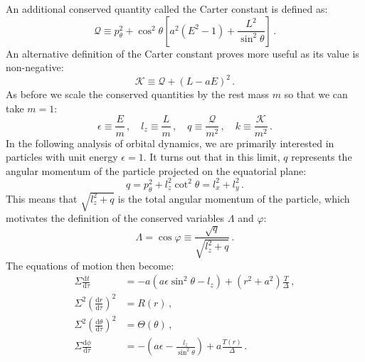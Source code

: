 \documentclass[
    reprint,
    prd,
    nofootinbib,
    amsmath,amssymb,
    aps,
    floatfix,
]{revtex4-2}
\begin{document}
An additional conserved quantity called the Carter constant is defined as:
\begin{equation}
    \mathcal{Q} \equiv p_{\theta}^{2} + \cos^{2}{\theta} \left[ a^{2} (E^{2} - 1) + \frac{L^{2}}{\sin^{2}{\theta}} \right] \, .
\end{equation}
An alternative definition of the Carter constant proves more useful as its value is non-negative:
\begin{equation}
    \mathcal{K} \equiv \mathcal{Q} + (L - aE)^{2} \, .
\end{equation}
As before we scale the conserved quantities by the rest mass $m$ so that we can take $m = 1$:
\begin{equation}
    \epsilon \equiv \frac{E}{m} \, , \quad l_{z} \equiv \frac{L}{m} \, , \quad q \equiv \frac{\mathcal{Q}}{m^{2}} \, , \quad k \equiv \frac{\mathcal{K}}{m^{2}} \, .
\end{equation}
In the following analysis of orbital dynamics, we are primarily interested in particles with unit energy $\epsilon = 1$. It turns out that in this limit, $q$ represents the angular momentum of the particle projected on the equatorial plane:
\begin{equation}
    q = p_{\theta}^{2} + l_{z}^{2} \cot^{2}{\theta} = l_{x}^{2} + l_{y}^{2} \, .
\end{equation}
This means that $\sqrt{l_{z}^{2} + q}$ is the total angular momentum of the particle, which motivates the definition of the conserved variables $\Lambda$ and $\varphi$:
\begin{equation}
    \Lambda = \cos{\varphi} \equiv \frac{\sqrt{q}}{\sqrt{l_{z}^{2} + q}} \, .
    \label{eq:lambda}
\end{equation}
The equations of motion then become:
\begin{equation}
    \begin{split}
        \Sigma \frac{\mathrm{d}t}{\mathrm{d}\tau} &= -a(a \epsilon \sin^{2}{\theta} - l_{z}) + (r^{2} + a^{2}) \frac{T}{\Delta} \, , \\
        \Sigma^{2} \left( \frac{\mathrm{d}r}{\mathrm{d}\tau} \right)^{2} &= R(r) \, , \\
        \Sigma^{2} \left( \frac{\mathrm{d}\theta}{\mathrm{d}\tau} \right)^{2} &= \Theta(\theta) \, , \\
        \Sigma \frac{\mathrm{d}\phi}{\mathrm{d}\tau} &= -\left( a \epsilon - \frac{l_{z}}{\sin^{2}{\theta}} \right) + a \frac{T(r)}{\Delta} \, .
    \end{split}
    \label{eq:kerr_first_integrals}
\end{equation}
\end{document}
